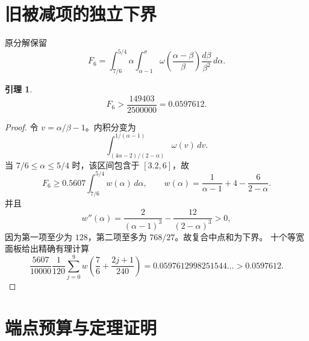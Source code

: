 \documentclass[UTF8,10pt,a4paper]{ctexart}
\newcommand{\1}{\mathbf{1}}
\newtheorem{lemma}[theorem]{引理}
\theoremstyle{remark}
\begin{document}
\section{旧被减项的独立下界}

原分解保留
\begin{equation}\label{eq:F6-zh}
 F_6=\int_{7/6}^{5/4}\alpha
 \int_{\alpha-1}^{\sigma}
 \omega\left(\frac{\alpha-\beta}{\beta}\right)
 \frac{d\beta}{\beta^2}\,d\alpha.
\end{equation}

\begin{lemma}\label{lem:F6-zh}
\[
 F_6>\frac{149403}{2500000}=0.0597612.
\]
\end{lemma}

\begin{proof}
令 $v=\alpha/\beta-1$。内积分变为
\[
 \int_{(4\alpha-2)/(2-\alpha)}^{1/(\alpha-1)}\omega(v)\,dv.
\]
当 $7/6\le\alpha\le5/4$ 时，该区间包含于 $[3.2,6]$，故
\[
 F_6\ge0.5607\int_{7/6}^{5/4}w(\alpha)\,d\alpha,\qquad
 w(\alpha)=\frac1{\alpha-1}+4-\frac6{2-\alpha}.
\]
并且
\[
 w''(\alpha)=\frac2{(\alpha-1)^3}-\frac{12}{(2-\alpha)^3}>0,
\]
因为第一项至少为 $128$，第二项至多为 $768/27$。故复合中点和为下界。
十个等宽面板给出精确有理计算
\[
 \frac{5607}{10000}\frac1{120}
 \sum_{j=0}^{9}w\left(\frac76+\frac{2j+1}{240}\right)
 =0.0597612998251544\ldots>0.0597612.
\]
\end{proof}

\section{端点预算与定理证明}
\end{document}
